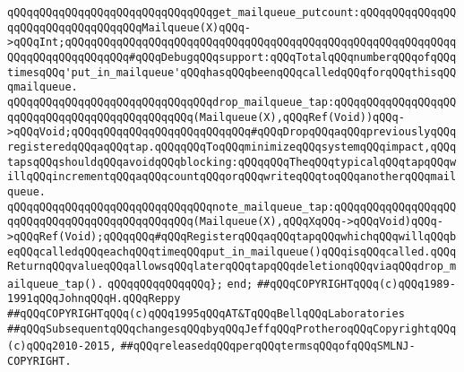 \verb|qQQqqQQqqQQqqQQqqQQqqQQqqQQqqQQqget_mailqueue_putcount:qQQqqQQqqQQqqQQqqQQqqQQqqQQqqQQqqQQqMailqueue(X)qQQq->qQQqInt;qQQqqQQqqQQqqQQqqQQqqQQqqQQqqQQqqQQqqQQqqQQqqQQqqQQqqQQqqQQqqQQqqQQqqQQqqQQqqQQq#qQQqDebugqQQqsupport:qQQqTotalqQQqnumberqQQqofqQQqtimesqQQq'put_in_mailqueue'qQQqhasqQQqbeenqQQqcalledqQQqforqQQqthisqQQqmailqueue.|\newline
\newline
\verb|qQQqqQQqqQQqqQQqqQQqqQQqqQQqqQQqdrop_mailqueue_tap:qQQqqQQqqQQqqQQqqQQqqQQqqQQqqQQqqQQqqQQqqQQqqQQq(Mailqueue(X),qQQqRef(Void))qQQq->qQQqVoid;qQQqqQQqqQQqqQQqqQQqqQQqqQQq#qQQqDropqQQqaqQQqpreviouslyqQQqregisteredqQQqaqQQqtap.qQQqqQQqToqQQqminimizeqQQqsystemqQQqimpact,qQQqtapsqQQqshouldqQQqavoidqQQqblocking:qQQqqQQqTheqQQqtypicalqQQqtapqQQqwillqQQqincrementqQQqaqQQqcountqQQqorqQQqwriteqQQqtoqQQqanotherqQQqmailqueue.|\newline
\verb|qQQqqQQqqQQqqQQqqQQqqQQqqQQqqQQqnote_mailqueue_tap:qQQqqQQqqQQqqQQqqQQqqQQqqQQqqQQqqQQqqQQqqQQqqQQq(Mailqueue(X),qQQqXqQQq->qQQqVoid)qQQq->qQQqRef(Void);qQQqqQQq#qQQqRegisterqQQqaqQQqtapqQQqwhichqQQqwillqQQqbeqQQqcalledqQQqeachqQQqtimeqQQqput_in_mailqueue()qQQqisqQQqcalled.qQQqReturnqQQqvalueqQQqallowsqQQqlaterqQQqtapqQQqdeletionqQQqviaqQQqdrop_mailqueue_tap().|\newline
\verb|qQQqqQQqqQQqqQQq};|\newline
\verb|end;|\newline
\newline
\newline
\verb|##qQQqCOPYRIGHTqQQq(c)qQQq1989-1991qQQqJohnqQQqH.qQQqReppy|\newline
\verb|##qQQqCOPYRIGHTqQQq(c)qQQq1995qQQqAT&TqQQqBellqQQqLaboratories|\newline
\verb|##qQQqSubsequentqQQqchangesqQQqbyqQQqJeffqQQqProtheroqQQqCopyrightqQQq(c)qQQq2010-2015,|\newline
\verb|##qQQqreleasedqQQqperqQQqtermsqQQqofqQQqSMLNJ-COPYRIGHT.|\newline

